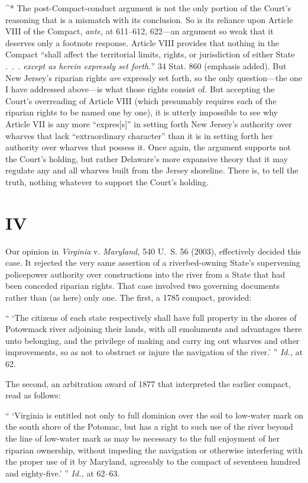 {^* The post-Compact-conduct argument is not the only portion of the
Court's reasoning that is a mismatch with its conclusion. So is its
reliance upon Article VIII of the Compact, \emph{ante,} at 611--612,
622---an argument so weak that it deserves only a footnote response.
Article VIII provides that nothing in the Compact ``shall affect the
territorial limits, rights, or jurisdiction of either State .~.~.
\emph{except as herein expressly set forth.}'' 34 Stat. 860 (emphasis
added). But New Jersey's riparian rights \emph{are} expressly set
forth, so the only question---the one I have addressed above---is what
those rights consist of. But accepting the Court's overreading of
Article VIII (which presumably requires each of the riparian rights to
be named one by one), it is utterly impossible to see why Article VII
is any more ``expres[s]'' in setting forth New Jersey's authority
over wharves that lack ``extraordinary character'' than it is in
setting forth her authority over wharves that possess it. Once again,
the argument supports not the Court's holding, but rather Delaware's
more expansive theory that it may regulate any and all wharves built
from the Jersey shoreline. There is, to tell the truth, nothing whatever
to support the Court's holding.


\section{IV}

  Our opinion in \emph{Virginia} v. \emph{Maryland,} 540 U.~S. 56 (2003),
effectively decided this case. It rejected the very same assertion of
a riverbed-owning State's supervening policepower authority over
constructions into the river from a State that had been conceded
riparian rights. That case involved two governing documents rather than
(as here) only one. The first, a 1785 compact, provided:

    `` ‘The citizens of each state respectively shall have full
    property in the shores of Potowmack river adjoining their lands,
    with all emoluments and advantages there unto belonging, and
    the privilege of making and carry ing out wharves and other
    improvements, so as not to obstruct or injure the navigation of the
    river.' '' \emph{Id.,} at 62.

\noindent The second, an arbitration award of 1877 that interpreted the earlier
compact, read as follows:

    `` ‘Virginia is entitled not only to full dominion over the soil
    to low-water mark on the south shore of the Potomac, but has a right
    to such use of the river beyond the line of low-water mark as may be
    necessary to the full enjoyment of her riparian ownership, without
    impeding the navigation or otherwise interfering with the proper use
    of it by Maryland, agreeably to the compact of seventeen hundred and
    eighty-five.' '' \emph{Id.,} at 62--63.

}
